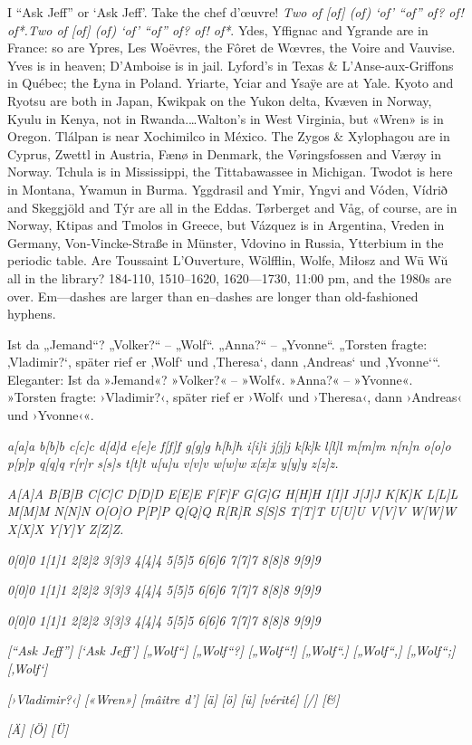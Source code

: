 %

I “Ask Jeff” or ‘Ask Jeff’. Take the chef d’œuvre! \emph{Two of [of] (of) 
‘of’ “of” of? of! of*.}\emph{Two of [of] (of) ‘of’ “of” of? of! of*}. Ydes,
Yffignac and Ygrande are in France: so are Ypres, Les Woëvres, the Fôret
de Wœvres, the Voire and Vauvise. Yves is in heaven; D’Amboise is in jail.
Lyford’s in Texas \& L’Anse-aux-Griffons in Québec; the Łyna in Poland.
Yriarte, Yciar and Ysaÿe are at Yale. Kyoto and Ryotsu are both in Japan,
Kwikpak on the Yukon delta, Kvæven in Norway, Kyulu in Kenya, not in
Rwanda.…Walton’s in West Virginia, but «Wren» is in Oregon. Tlálpan is
near Xochimilco in México. The Zygos \& Xylophagou are in Cyprus, Zwettl
in Austria, Fænø in Denmark, the Vøringsfossen and Værøy in Norway. Tchula
is in Mississippi, the Tittabawassee in Michigan. Twodot is here in Montana,
Ywamun in Burma. Yggdrasil and Ymir, Yngvi and Vóden, Vídrið and Skeggjöld
and Týr are all in the Eddas. Tørberget and Våg, of course, are in Norway,
Ktipas and Tmolos in Greece, but Vázquez is in Argentina, Vreden in
Germany, Von-Vincke-Straße in Münster, Vdovino in Russia, Ytterbium in the
periodic table. Are Toussaint L’Ouverture, Wölfflin, Wolfe, Miłosz and Wū Wŭ
all in the library? 184-110, 1510--1620, 1620---1730, 11:00 pm, and the 1980s
are over. Em---dashes are larger than en--dashes are longer than 
old-fashioned hyphens.

Ist da „Jemand“? „Volker?“ – „Wolf“. „Anna?“ – „Yvonne“. „Torsten fragte:
‚Vladimir?‘, später rief er ‚Wolf‘ und ‚Theresa‘, dann ‚Andreas‘ und ‚Yvonne‘“.
Eleganter: Ist da »Jemand«? »Volker?« – »Wolf«. »Anna?« – »Yvonne«. »Torsten
fragte: ›Vladimir?‹, später rief er ›Wolf‹ und ›Theresa‹, dann ›Andreas‹ 
und ›Yvonne‹«.

\emph{%
a[a]a b[b]b c[c]c d[d]d e[e]e f[f]f %
g[g]g h[h]h i[i]i j[j]j k[k]k l[l]l %
m[m]m n[n]n o[o]o p[p]p q[q]q r[r]r %
s[s]s t[t]t u[u]u v[v]v w[w]w x[x]x %
y[y]y z[z]z.%
} \par
\emph{%
A[A]A B[B]B C[C]C D[D]D E[E]E F[F]F %
G[G]G H[H]H I[I]I J[J]J K[K]K L[L]L %
M[M]M N[N]N O[O]O P[P]P Q[Q]Q R[R]R %
S[S]S T[T]T U[U]U V[V]V W[W]W X[X]X %
Y[Y]Y Z[Z]Z.%
} \par
{%
\emph{%
0[0]0 1[1]1 2[2]2 3[3]3 4[4]4 %
5[5]5 6[6]6 7[7]7 8[8]8 9[9]9
}} \par
{%
\emph{%
0[0]0 1[1]1 2[2]2 3[3]3 4[4]4 %
5[5]5 6[6]6 7[7]7 8[8]8 9[9]9
}} \par
{%
\emph{%
0[0]0 1[1]1 2[2]2 3[3]3 4[4]4 %
5[5]5 6[6]6 7[7]7 8[8]8 9[9]9
}} \par
\emph{%
[“Ask Jeff”] [‘Ask Jeff’] [„Wolf“] [„Wolf“?] [„Wolf“!] [„Wolf“.] [„Wolf“,] [„Wolf“;]%
[‚Wolf‘]} \par
\emph{%
[›Vladimir?‹] [«Wren»] [mâitre d’] [ä] [ö] [ü] %
[vérité] [/] [\&]
} \par
\emph{%
[Ä] [Ö] [Ü]
}
